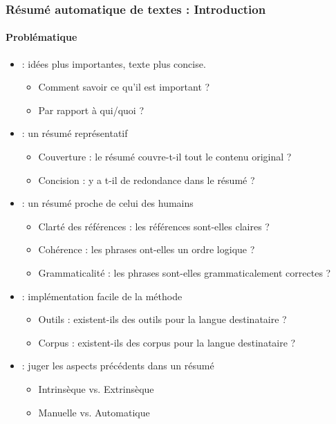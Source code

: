 \documentclass[xcolor=table]{beamer}
\begin{document}
\begin{frame}
	\frametitle{Résumé automatique de textes : Introduction}
	\framesubtitle{Problématique}
	
	\vspace{-6pt}
	\begin{itemize}
		\item {} : idées plus importantes, texte plus concise. 
		\begin{itemize}
			\item Comment savoir ce qu'il est important ?
			\item Par rapport à qui/quoi ?
		\end{itemize}
		\item {} : un résumé représentatif  
		\begin{itemize}
			\item Couverture : le résumé couvre-t-il tout le contenu original ?
			\item Concision : y a t-il de redondance dans le résumé ?
		\end{itemize}
		\item {} : un résumé proche de celui des humains
		\begin{itemize}
			\item Clarté des références : les références sont-elles claires ?
			\item Cohérence : les phrases ont-elles un ordre logique ?
			\item Grammaticalité : les phrases sont-elles grammaticalement correctes ?
		\end{itemize}
		\item {} : implémentation facile de la méthode
		\begin{itemize}
			\item Outils : existent-ils des outils pour la langue destinataire ?
			\item Corpus : existent-ils des corpus pour la langue destinataire ?
		\end{itemize}
		\item {} : juger les aspects précédents dans un résumé 
		\begin{itemize}
			\item Intrinsèque vs. Extrinsèque
			\item Manuelle vs. Automatique
		\end{itemize}
	\end{itemize}
	
\end{frame}
\end{document}
